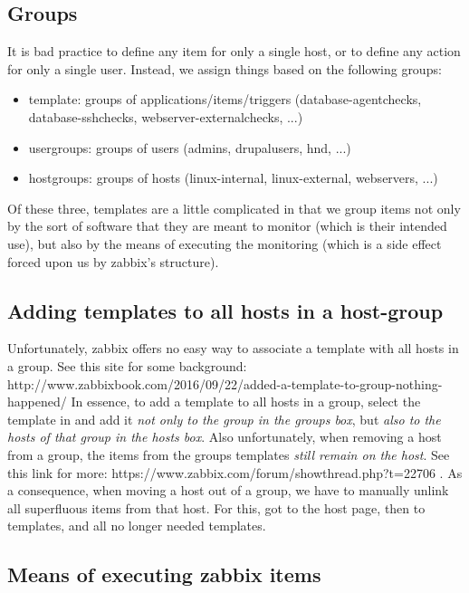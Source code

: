 \subsection{Groups}

It is bad practice to define any item for only a single host, or to define any action for only a single user. Instead, we assign things based on the following groups:

\begin{itemize}
    \item template: groups of applications/items/triggers (database-agentchecks, database-sshchecks, webserver-externalchecks, ...)
    \item usergroups: groups of users (admins, drupalusers, hnd, ...)
    \item hostgroups: groups of hosts (linux-internal, linux-external, webservers, ...)
\end{itemize}

Of these three, templates are a little complicated in that we group items not only by the sort of software that they are meant to monitor (which is their intended use), but also by the means of executing the monitoring  (which is a side effect forced upon us by zabbix's structure).


\subsection{Adding templates to all hosts in a host-group}
Unfortunately, zabbix offers no easy way to associate a template with all hosts in a group. See this site for some background: http://www.zabbixbook.com/2016/09/22/added-a-template-to-group-nothing-happened/
In essence, to add a template to all hosts in a group, select the template in   and add it \emph{not only to the group in the groups box}, but \emph{also to the hosts of that group in the hosts box}.
Also unfortunately, when removing a host from a group, the items from the groups templates \emph{still remain on the host}. See this link for more: https://www.zabbix.com/forum/showthread.php?t=22706 . As a consequence, when moving a host out of a group, we have to manually unlink all superfluous items from that host. For this, got to the host page, then to templates, and  all no longer needed templates. 

\subsection{Means of executing zabbix items}

